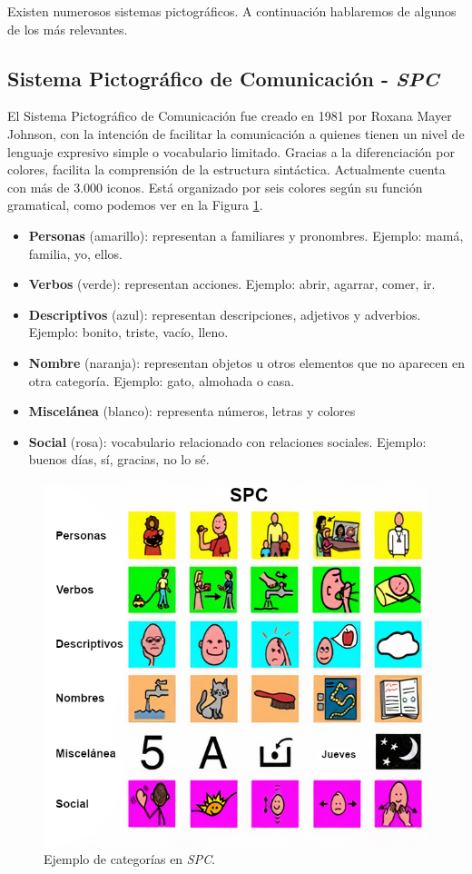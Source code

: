  
Existen numerosos sistemas pictográficos. A continuación hablaremos de algunos de los más relevantes.

\subsection{Sistema Pictográfico de Comunicación - \textit{SPC}}
\label{cap3:sec:spc}
El Sistema Pictográfico de Comunicación \citep{spc} fue creado en 1981 por Roxana Mayer Johnson, con la intención de facilitar la comunicación a quienes tienen un nivel de lenguaje expresivo simple o vocabulario limitado. Gracias a la diferenciación por colores, facilita la comprensión de la estructura sintáctica. Actualmente cuenta con más de 3.000 iconos. Está organizado por seis colores según su función gramatical, como podemos ver en la Figura \ref{fig:spccolores}.

\begin{itemize}
	\item \textbf{Personas} (amarillo): representan a familiares y pronombres. Ejemplo: mamá, familia,  yo, ellos.
	\item \textbf{Verbos} (verde): representan acciones. Ejemplo: abrir, agarrar, comer, ir.
	\item \textbf{Descriptivos} (azul): representan descripciones, adjetivos y adverbios. Ejemplo: bonito, triste, vacío, lleno.
	\item \textbf{Nombre} (naranja): representan objetos u otros elementos que no aparecen en otra categoría. Ejemplo: gato, almohada o casa.
	\item \textbf{Miscelánea} (blanco): representa números, letras y colores
	\item \textbf{Social} (rosa): vocabulario relacionado con relaciones sociales. Ejemplo: buenos días, sí, gracias, no lo sé.
	
\end{itemize}

\begin{figure}[h!]
	\centering
	\includegraphics[width=0.8\linewidth]{Imagenes/Bitmap/SPCcolores}
	\caption{Ejemplo de categorías en \textit{SPC}.}
	\label{fig:spccolores}
\end{figure}

